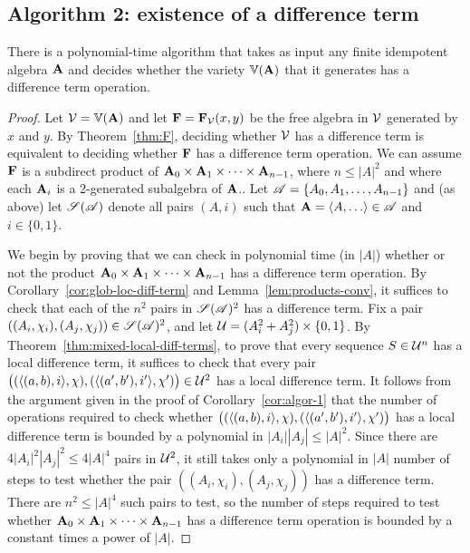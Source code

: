 \subsection{Algorithm 2: existence of a difference term}
\label{sec:algor-2}
\begin{cor}
\label{cor:algor-2}
  There is a polynomial-time algorithm that takes as input
  any finite idempotent algebra $\mathbf{A}$ and decides whether
  the variety $\operatorname{\mathbb{V}}(\mathbf{A})$ that it generates
  has a difference term operation.
\end{cor}
\begin{proof}
  Let $\mathcal{V} = \operatorname{\mathbb{V}}(\mathbf{A})$ and let $\mathbf{F} = \mathbf{F}_{\mathcal{V}}(x,y)$ be the free algebra in
  $\mathcal{V}$ generated by $x$ and $y$.
  By Theorem~\ref{thm:F}, deciding whether $\mathcal{V}$ has a difference term is equivalent to 
  deciding whether $\mathbf{F}$ has a difference term operation.
  We can assume $\mathbf{F}$ is a subdirect product of
  $\mathbf{A}_0 \times \mathbf{A}_1 \times \cdots \times \mathbf{A}_{n-1}$, where $n\leq |A|^2$ and
  where each $\mathbf{A}_i$ is a 2-generated subalgebra of $\mathbf{A}$..
  Let $\mathscr{A} = \{A_0, A_1, \dots, A_{n-1}\}$ and (as above) let $\mathscr{S}(\mathscr{A})$ denote 
  all pairs $(A, i)$ such that $\bA = \<A, \dots\> \in \scA$ and $i\in \{0,1\}$.

  We begin by proving that we can check in polynomial time (in $|A|$)
  whether or not the product
  $\mathbf{A}_0 \times \mathbf{A}_1 \times \cdots \times \mathbf{A}_{n-1}$ has a difference term operation.
  By Corollary~\ref{cor:glob-loc-diff-term} and Lemma~\ref{lem:products-conv},
  it suffices to check that each of the 
  $n^2$ pairs  in 
  $\mathscr{S}(\mathscr{A})^2$ has a \glocal
  difference term.  Fix a pair
  $((A_i, \chi_i), (A_j, \chi_j)) \in  \mathscr{S}(\mathscr{A})^2$,
  and let $\mathcal{U}  = (A_i^2 + A_j^2)\times \{0,1\}$.
  By Theorem~\ref{thm:mixed-local-diff-terms},
  to prove that every sequence $S \in \mathcal{U}^n$
  has a local difference term, it suffices to check that every pair
  $\bigl( (\langle(a, b), i\rangle, \chi), (\langle(a', b'), i'\rangle, \chi')\bigr) \in \mathcal{U}^2$
  has a local difference term. It follows from the argument given 
  in the proof of Corollary~\ref{cor:algor-1} that the number of 
  operations required to check whether
  $\bigl( (\langle(a, b), i\rangle, \chi), (\langle(a', b'), i'\rangle, \chi')\bigr)$
  has a local difference term is bounded by a
  polynomial in $|A_i||A_j|\leq |A|^2$.  Since there are 
  $4|A_i|^2|A_j|^2 \leq 4|A|^4$ pairs in $\mathcal{U}^2$, 
  it still takes only a polynomial in $|A|$ number of steps to test whether
  the pair $((A_i, \chi_i), (A_j, \chi_j))$ has a \glocal difference term.
  There are $n^2 \leq |A|^4$ such pairs to test, so the number of steps required to 
  test whether
  $\mathbf{A}_0 \times \mathbf{A}_1 \times \cdots \times \mathbf{A}_{n-1}$ has a difference term
  operation is bounded by a constant times a power of $|A|$.


\end{proof}
